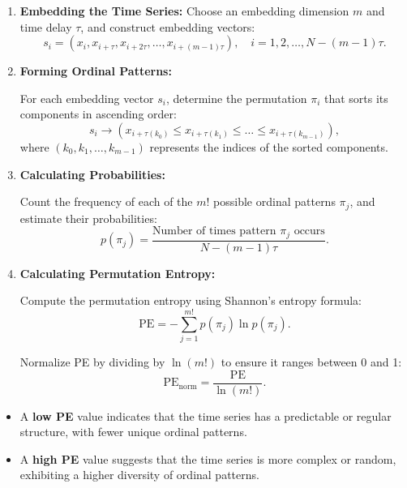 \begin{enumerate} \item \textbf{Embedding the Time Series:}
Choose an embedding dimension $m$ and time delay $\tau$, and construct embedding vectors:
\begin{equation}
    s_i = \left( x_i, x_{i+\tau}, x_{i+2\tau}, \dots, x_{i+(m-1)\tau} \right), \quad i = 1,2,\dots, N - (m -1)\tau.
\end{equation}

\item \textbf{Forming Ordinal Patterns:}

For each embedding vector $s_i$, determine the permutation $\pi_i$ that sorts its components in ascending order:
\begin{equation}
    s_i \rightarrow \left( x_{i+\tau(k_0)} \leq x_{i+\tau(k_1)} \leq \dots \leq x_{i+\tau(k_{m-1})} \right),
\end{equation}
where $(k_0, k_1, \dots, k_{m-1})$ represents the indices of the sorted components.

\item \textbf{Calculating Probabilities:}

Count the frequency of each of the $m!$ possible ordinal patterns $\pi_j$, and estimate their probabilities:
\begin{equation}
    p(\pi_j) = \frac{\text{Number of times pattern } \pi_j \text{ occurs}}{N - (m -1)\tau}.
\end{equation}

\item \textbf{Calculating Permutation Entropy:}

Compute the permutation entropy using Shannon's entropy formula:
\begin{equation}
    \mathrm{PE} = - \sum_{j=1}^{m!} p(\pi_j) \ln p(\pi_j).
\end{equation}

Normalize PE by dividing by $\ln(m!)$ to ensure it ranges between 0 and 1:
\begin{equation}
    \mathrm{PE}_{\text{norm}} = \frac{\mathrm{PE}}{\ln(m!)}.
\end{equation}
\end{enumerate}

\begin{itemize} \item A \textbf{low PE} value indicates that the time series has a predictable or regular structure, with fewer unique ordinal patterns. \item A \textbf{high PE} value suggests that the time series is more complex or random, exhibiting a higher diversity of ordinal patterns. \end{itemize}


